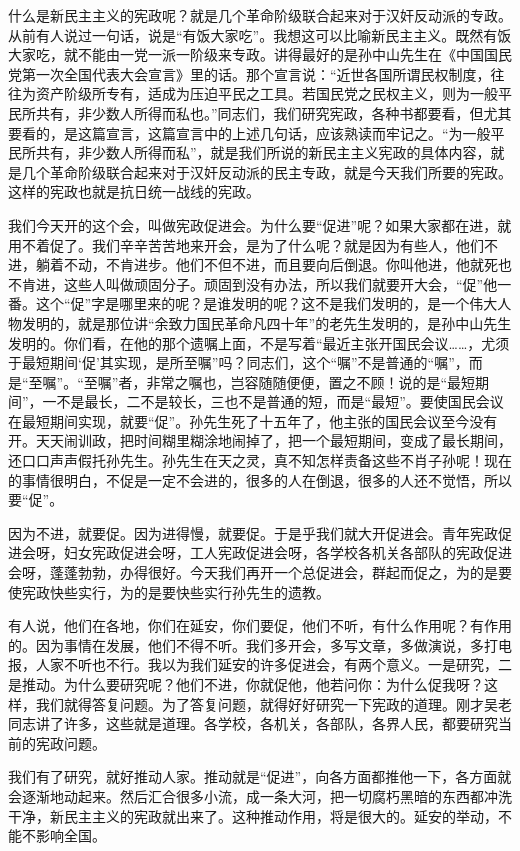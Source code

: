 什么是新民主主义的宪政呢？就是几个革命阶级联合起来对于汉奸反动派的专政。从前有人说过一句话，说是“有饭大家吃”。我想这可以比喻新民主主义。既然有饭大家吃，就不能由一党一派一阶级来专政。讲得最好的是孙中山先生在《中国国民党第一次全国代表大会宣言》里的话。那个宣言说：“近世各国所谓民权制度，往往为资产阶级所专有，适成为压迫平民之工具。若国民党之民权主义，则为一般平民所共有，非少数人所得而私也。”同志们，我们研究宪政，各种书都要看，但尤其要看的，是这篇宣言，这篇宣言中的上述几句话，应该熟读而牢记之。“为一般平民所共有，非少数人所得而私”，就是我们所说的新民主主义宪政的具体内容，就是几个革命阶级联合起来对于汉奸反动派的民主专政，就是今天我们所要的宪政。这样的宪政也就是抗日统一战线的宪政。

我们今天开的这个会，叫做宪政促进会。为什么要“促进”呢？如果大家都在进，就用不着促了。我们辛辛苦苦地来开会，是为了什么呢？就是因为有些人，他们不进，躺着不动，不肯进步。他们不但不进，而且要向后倒退。你叫他进，他就死也不肯进，这些人叫做顽固分子。顽固到没有办法，所以我们就要开大会，“促”他一番。这个“促”字是哪里来的呢？是谁发明的呢？这不是我们发明的，是一个伟大人物发明的，就是那位讲“余致力国民革命凡四十年”的老先生发明的，是孙中山先生发明的。你们看，在他的那个遗嘱上面，不是写着“最近主张开国民会议……，尤须于最短期间‘促’其实现，是所至嘱”吗？同志们，这个“嘱”不是普通的“嘱”，而是“至嘱”。“至嘱”者，非常之嘱也，岂容随随便便，置之不顾！说的是“最短期间”，一不是最长，二不是较长，三也不是普通的短，而是“最短”。要使国民会议在最短期间实现，就要“促”。孙先生死了十五年了，他主张的国民会议至今没有开。天天闹训政，把时间糊里糊涂地闹掉了，把一个最短期间，变成了最长期间，还口口声声假托孙先生。孙先生在天之灵，真不知怎样责备这些不肖子孙呢！现在的事情很明白，不促是一定不会进的，很多的人在倒退，很多的人还不觉悟，所以要“促”。

因为不进，就要促。因为进得慢，就要促。于是乎我们就大开促进会。青年宪政促进会呀，妇女宪政促进会呀，工人宪政促进会呀，各学校各机关各部队的宪政促进会呀，蓬蓬勃勃，办得很好。今天我们再开一个总促进会，群起而促之，为的是要使宪政快些实行，为的是要快些实行孙先生的遗教。

有人说，他们在各地，你们在延安，你们要促，他们不听，有什么作用呢？有作用的。因为事情在发展，他们不得不听。我们多开会，多写文章，多做演说，多打电报，人家不听也不行。我以为我们延安的许多促进会，有两个意义。一是研究，二是推动。为什么要研究呢？他们不进，你就促他，他若问你：为什么促我呀？这样，我们就得答复问题。为了答复问题，就得好好研究一下宪政的道理。刚才吴老同志讲了许多，这些就是道理。各学校，各机关，各部队，各界人民，都要研究当前的宪政问题。

我们有了研究，就好推动人家。推动就是“促进”，向各方面都推他一下，各方面就会逐渐地动起来。然后汇合很多小流，成一条大河，把一切腐朽黑暗的东西都冲洗干净，新民主主义的宪政就出来了。这种推动作用，将是很大的。延安的举动，不能不影响全国。

